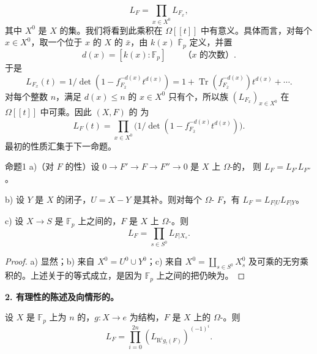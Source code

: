 \[
L_F=\prod_{x\in X^0}L_{F_x},
\]
其中 $X^0$ 是 $X$ 的集。我们将看到此乘积在 $\Omega[[t]]$ 中有意义。具体而言，对每个 $x\in X^0$，取一个位于 $x$ 的 $X$ 的 $\bar x$，由 $k(x)$  $\overline{\mathbb F}_p$ 定义，并置
\[
d(x)=[k(x):\mathbb F_p]\qquad\text{（$x$ 的次数）}.
\]
于是
\[
L_{F_x}(t)=1/\det(1-f_{F_{\bar x}}^{-d(x)}t^{d(x)})
=1+\operatorname{Tr}(f_{F_{\bar x}}^{-d(x)})t^{d(x)}+\cdots.
\]
对每个整数 $n$，满足 $d(x)\leq n$ 的 $x\in X^0$ 只有个，所以族 $(L_{F_x})_{x\in X^0}$ 在 $\Omega[[t]]$ 中可乘。因此 $(X,F)$ 的 为
\[
L_F(t)=\prod_{x\in X^0}\bigl(1/\det(1-f_{F_{\bar x}}^{-d(x)}t^{d(x)})\bigr).
\]
最初的性质汇集于下一命题。
\begin{SGAresult}{命题}{1}
a)（对 $F$ 的性）设 $0\to F'\to F\to F''\to0$ 是 $X$ 上 $\Omega$-的，
则 $L_F=L_{F'}L_{F''}$。

b) 设 $Y$ 是 $X$ 的闭子，$U=X-Y$ 是其补。则对每个 $\Omega$- $F$，有 $L_F=L_{F|U}L_{F|Y}$。

c) 设 $X\to S$ 是 $\mathbb F_p$ 上之间的，$F$ 是 $X$ 上 $\Omega$-。则
\[
L_F=\prod_{s\in S^0}L_{F|X_s}.
\]
\end{SGAresult}
\begin{proof}
a) 显然；b) 来自 $X^0=U^0\cup Y^0$；c) 来自 $X^0=\coprod_{s\in S^0}X_s^0$ 及可乘的无穷乘积的。上述关于的等式成立，是因为 $\mathbb F_p$ 上之间的把仍映为。
\end{proof}
\textbf{2. 有理性的陈述及向情形的。}
\begin{SGAresult}{}{}
设 $X$ 是 $\mathbb F_p$ 上为 $n$ 的，$g:X\to e$ 为结构，$F$ 是 $X$ 上的 $\Omega$-。则
\[
L_F=\prod_{i=0}^{2n}(L_{\mathrm R^ig_!(F)})^{(-1)^i}.
\tag{1}
\]
\end{SGAresult}
